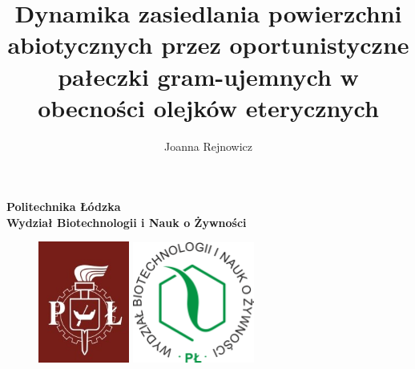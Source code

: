 \documentclass[11pt,a4paper]{report}
\author{Joanna Rejnowicz}
\title{Dynamika zasiedlania powierzchni abiotycznych przez oportunistyczne pałeczki gram-ujemnych w obecności olejków eterycznych}
\begin{document}
\begin{titlepage}
\begin{center}
\LARGE \bf Politechnika Łódzka\\
\large Wydział Biotechnologii i Nauk o Żywności\\
\vskip 24pt
\thispagestyle{empty}
\begin{figure}[htb]
\includegraphics[width=3cm]{./img/logo_pl.jpg}
\hfill
\includegraphics[width=4cm]{./img/logo_binoz.png}
\end{figure}
\end{center}

\vskip 12pt


\end{titlepage}
\end{document}
